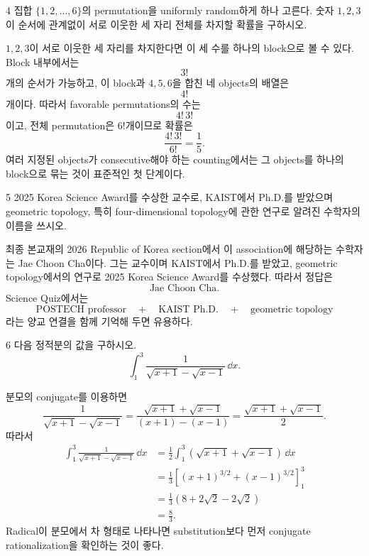 \begin{problem}{4}
집합 $\{1,2,\ldots,6\}$의 permutation을 uniformly random하게 하나 고른다. 숫자 $1,2,3$이 순서에 관계없이 서로 이웃한 세 자리 전체를 차지할 확률을 구하시오.
\end{problem}

\begin{solution}
$1,2,3$이 서로 이웃한 세 자리를 차지한다면 이 세 수를 하나의 block으로 볼 수 있다. Block 내부에서는
\[
    3!
\]
개의 순서가 가능하고, 이 block과 $4,5,6$을 합친 네 objects의 배열은
\[
    4!
\]
개이다. 따라서 favorable permutations의 수는
\[
    4!\,3!
\]
이고, 전체 permutation은 $6!$개이므로 확률은
\[
    \frac{4!\,3!}{6!}
    =\boxed{\frac15}.
\]
여러 지정된 objects가 consecutive해야 하는 counting에서는 그 objects를 하나의 block으로 묶는 것이 표준적인 첫 단계이다.
\end{solution}

\begin{problem}{5}
2025 Korea Science Award를 수상한 \POSTECHKorean{} 교수로, \textup{KAIST}에서 Ph.D.를 받았으며 geometric topology, 특히 four-dimensional topology에 관한 연구로 알려진 수학자의 이름을 쓰시오.
\end{problem}

\begin{solution}
최종 본교재의 2026 Republic of Korea section에서 이 association에 해당하는 수학자는 Jae Choon Cha이다. 그는 \POSTECHKorean{} 교수이며 KAIST에서 Ph.D.를 받았고, geometric topology에서의 연구로 2025 Korea Science Award를 수상했다. 따라서 정답은
\[
    \boxed{\text{Jae Choon Cha}}.
\]
Science Quiz에서는
\[
    \text{POSTECH professor}
    \quad+\quad
    \text{KAIST Ph.D.}
    \quad+\quad
    \text{geometric topology}
\]
라는 양교 연결을 함께 기억해 두면 유용하다.
\end{solution}

\begin{problem}{6}
다음 정적분의 값을 구하시오.
\[
    \int_1^3
    \frac{1}{\sqrt{x+1}-\sqrt{x-1}}\,\dd x.
\]
\end{problem}

\begin{solution}
분모의 conjugate를 이용하면
\[
    \frac{1}{\sqrt{x+1}-\sqrt{x-1}}
    =\frac{\sqrt{x+1}+\sqrt{x-1}}{(x+1)-(x-1)}
    =\frac{\sqrt{x+1}+\sqrt{x-1}}{2}.
\]
따라서
\[
    \begin{aligned}
    \int_1^3
    \frac{1}{\sqrt{x+1}-\sqrt{x-1}}\,\dd x
    &=%
    \frac12\int_1^3
    \left(\sqrt{x+1}+\sqrt{x-1}\right)\,\dd x\\
    &=\frac13
    \left[(x+1)^{3/2}+(x-1)^{3/2}\right]_1^3\\
    &=\frac13\left(8+2\sqrt2-2\sqrt2\right)\\
    &=\boxed{\frac83}.
    \end{aligned}
\]
Radical이 분모에서 차 형태로 나타나면 substitution보다 먼저 conjugate rationalization을 확인하는 것이 좋다.
\end{solution}

